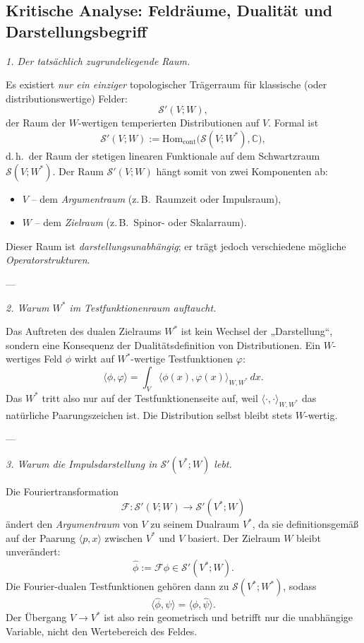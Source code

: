 \documentclass[10pt, letterpaper]{article}
\newcommand{\C}{\mathbb{C}}
\newcommand{\Hom}{\mathrm{Hom}}
\begin{document}
\subsection{Kritische Analyse: Feldräume, Dualität und Darstellungsbegriff}

\emph{1. Der tatsächlich zugrundeliegende Raum.}

Es existiert \emph{nur ein einziger} topologischer Trägerraum für klassische (oder distributionswertige) Felder:
\[
\mathcal{S}'(V;W),
\]
der Raum der $W$-wertigen temperierten Distributionen auf $V$.  
Formal ist
\[
\mathcal{S}'(V;W):=\Hom_{\mathrm{cont}}\big(\mathcal{S}(V;W^\ast),\C\big),
\]
d.\,h.\ der Raum der stetigen linearen Funktionale auf dem Schwartzraum $\mathcal{S}(V;W^\ast)$.
Der Raum $\mathcal{S}'(V;W)$ hängt somit von zwei Komponenten ab:
\begin{itemize}
\item $V$ – dem \emph{Argumentraum} (z.\,B.\ Raumzeit oder Impulsraum),
\item $W$ – dem \emph{Zielraum} (z.\,B.\ Spinor- oder Skalarraum).
\end{itemize}
Dieser Raum ist \emph{darstellungsunabhängig}; er trägt jedoch verschiedene mögliche \emph{Operatorstrukturen}.

---

\emph{2. Warum $W^\ast$ im Testfunktionenraum auftaucht.}

Das Auftreten des dualen Zielraums $W^\ast$ ist kein Wechsel der „Darstellung“, sondern eine Konsequenz der Dualitätsdefinition von Distributionen.  
Ein $W$-wertiges Feld $\phi$ wirkt auf $W^\ast$-wertige Testfunktionen $\varphi$:
\[
\langle \phi,\varphi\rangle
= \int_V \langle \phi(x),\varphi(x)\rangle_{W,W^\ast}\,dx.
\]
Das $W^\ast$ tritt also nur auf der Testfunktionenseite auf, weil $\langle \cdot,\cdot\rangle_{W,W^\ast}$ das natürliche Paarungszeichen ist.  
Die Distribution selbst bleibt stets $W$-wertig.

---

\emph{3. Warum die Impulsdarstellung in $\mathcal{S}'(V^\ast;W)$ lebt.}

Die Fouriertransformation
\[
\mathcal{F}:\mathcal{S}'(V;W)\longrightarrow\mathcal{S}'(V^\ast;W)
\]
ändert den \emph{Argumentraum} von $V$ zu seinem Dualraum $V^\ast$, da sie definitionsgemäß auf der Paarung
$\langle p,x\rangle$ zwischen $V^\ast$ und $V$ basiert.  
Der Zielraum $W$ bleibt unverändert:
\[
\widehat{\phi} := \mathcal{F}\phi \in \mathcal{S}'(V^\ast;W).
\]
Die Fourier-dualen Testfunktionen gehören dann zu $\mathcal{S}(V^\ast;W^\ast)$, sodass
\[
\langle \widehat{\phi},\psi\rangle = \langle \phi,\widehat{\psi}\rangle.
\]
Der Übergang $V \to V^\ast$ ist also rein geometrisch und betrifft nur die unabhängige Variable, nicht den Wertebereich des Feldes.
\end{document}
